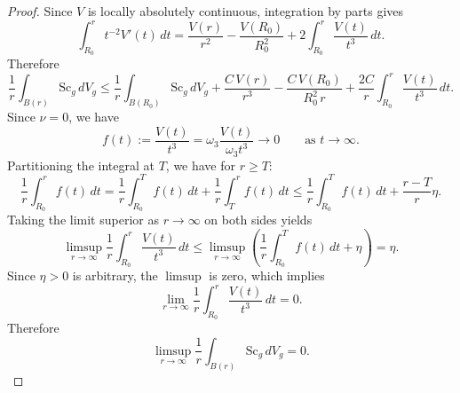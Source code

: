 \documentclass[12pt,oneside,a4paper]{article}
\theoremstyle{mytheorem}
\theoremstyle{remark}
\begin{document}
\begin{proof}
Since $V$ is locally absolutely continuous, integration by parts gives
\[
\int_{R_0}^{r} t^{-2}V'(t)\,dt
=
\frac{V(r)}{r^2}-\frac{V(R_0)}{R_0^2}
+2\int_{R_0}^{r}\frac{V(t)}{t^3}\,dt.
\]
Therefore
\[
\frac1r\int_{B(r)}\mathrm{Sc}_g\,dV_g
\le
\frac1r\int_{B(R_0)}\mathrm{Sc}_g\,dV_g
+\frac{C\,V(r)}{r^3}
-\frac{C\,V(R_0)}{R_0^2\,r}
+\frac{2C}{r}\int_{R_0}^{r}\frac{V(t)}{t^3}\,dt.
\]
Since  $\nu=0$, we have 
\[
f(t):= \frac{V(t)}{t^3}=\omega_3\frac{V(t)}{\omega_3 t^3}\longrightarrow 0
\qquad\text{as }t\to\infty.
\]
 Partitioning the integral at $T$, we have for $r \ge T$:$$\frac{1}{r} \int_{R_0}^{r} f(t) \, dt = \frac{1}{r} \int_{R_0}^{T} f(t) \, dt + \frac{1}{r} \int_{T}^{r} f(t) \, dt \le \frac{1}{r} \int_{R_0}^{T} f(t) \, dt + \frac{r-T}{r}\eta.$$Taking the limit superior as $r \to \infty$ on both sides yields$$\limsup_{r \to \infty} \frac{1}{r} \int_{R_0}^{r} \frac{V(t)}{t^3} \, dt \le \limsup_{r \to \infty} \left( \frac{1}{r} \int_{R_0}^{T} f(t) \, dt + \eta \right) = \eta.$$Since $\eta > 0$ is arbitrary, the $\limsup$ is zero, which implies$$\lim_{r \to \infty} \frac{1}{r} \int_{R_0}^{r} \frac{V(t)}{t^3} \, dt = 0.$$
Therefore
\[  
\limsup_{r\to\infty}\frac1r\int_{B(r)}\mathrm{Sc}_g\,dV_g=0.
\]    



\end{proof}
\end{document}
